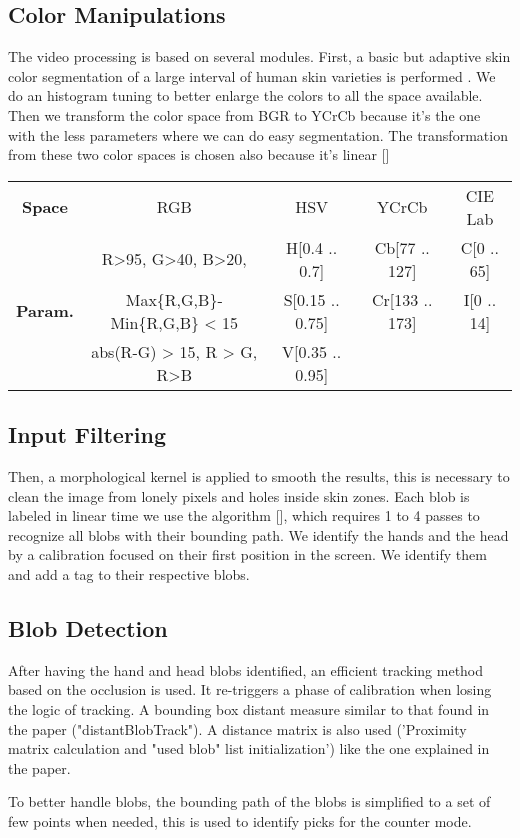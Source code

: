 \documentclass{llncs}
\newcommand\ignore[1]{}
\begin{document}
\ignore{
} 

\subsection{Color Manipulations}
The video processing is based on several modules. First, a basic but adaptive skin color segmentation of a large interval of human skin varieties is performed \cite{skinColorSeg}.
We do an histogram tuning to better enlarge the colors to all the space available.
Then we transform the color space from BGR to YCrCb because it’s the one with the less parameters where we can do easy segmentation. The transformation from these two color spaces is chosen also because it’s linear []

\begin{center}
\begin{tabular}{c|c|c|c|c}
\textbf{Space} & RGB & HSV & YCrCb & CIE Lab\\
  & R>95, G>40, B>20, & H[0.4 .. 0.7] & Cb[77 .. 127] & C[0 .. 65] \\
\textbf{Param.} & Max\{R,G,B\}-Min\{R,G,B\} < 15 & S[0.15 .. 0.75] & Cr[133 .. 173] & I[0 .. 14] \\
  & abs(R-G) > 15, R > G, R>B & V[0.35 .. 0.95] & &
\end{tabular}
\end{center}

\subsection{Input Filtering}
Then, a morphological kernel is applied to smooth the results, this is necessary to clean the image from lonely pixels and holes inside skin zones.
Each blob is labeled in linear time we use the algorithm [], which requires 1 to 4 passes to recognize all blobs with their bounding path.
We identify the hands and the head by a calibration focused on their first position in the screen. We identify them and add a tag to their respective blobs.

\subsection{Blob Detection}
After having the hand and head blobs identified, an efficient tracking method based on the occlusion is used. It re-triggers a phase of calibration when losing the logic of tracking.
A bounding box distant measure similar to that found in the paper \cite{app06} ("distantBlobTrack"). A distance matrix is also used ('Proximity matrix calculation and "used blob" list initialization') like the one explained in the paper. 
\ignore{
When the matrix of distance is set up, there are some loops:
* A loop for detect inactive tracks: those tracks with no blobs near.
* Detect and create new tracks: those blobs without a track near.
* A loop to assign blobs to tracks. It makes clusters with blobs that are close and assign them to a track. In this step some tracks could merge in one.
* At the end, all inactive tracks are checked to delete the old ones.
}
To better handle blobs, the bounding path of the blobs is simplified to a set of few points when needed, this is used to identify picks for the counter mode.
\end{document}
